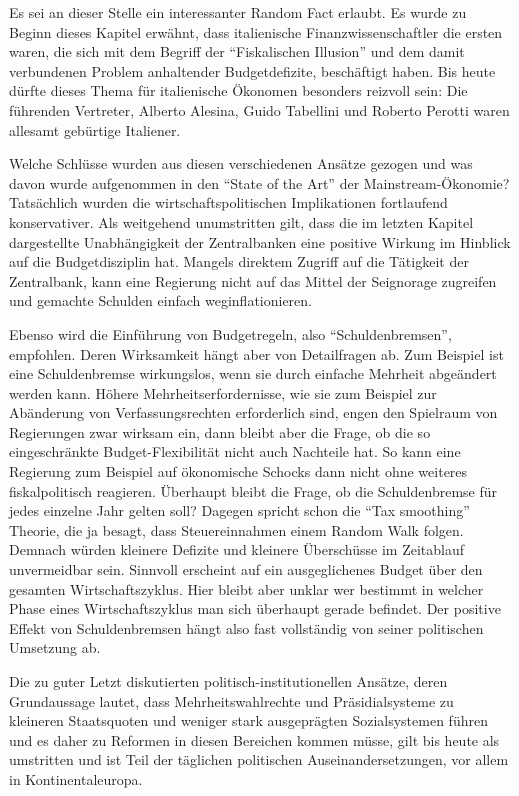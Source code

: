 Es sei an dieser Stelle ein interessanter Random Fact erlaubt. Es wurde zu Beginn dieses Kapitel erwähnt, dass italienische Finanzwissenschaftler die ersten waren, die sich mit dem Begriff der "`Fiskalischen Illusion"' und dem damit verbundenen Problem anhaltender Budgetdefizite, beschäftigt haben. Bis heute dürfte dieses Thema für italienische Ökonomen besonders reizvoll sein: Die führenden Vertreter, Alberto Alesina, Guido Tabellini und Roberto Perotti waren allesamt gebürtige Italiener.

Welche Schlüsse wurden aus diesen verschiedenen Ansätze gezogen und was davon wurde aufgenommen in den "`State of the Art"' der Mainstream-Ökonomie? Tatsächlich wurden die wirtschaftspolitischen Implikationen fortlaufend konservativer. Als weitgehend unumstritten gilt, dass die im letzten Kapitel dargestellte Unabhängigkeit der Zentralbanken eine positive Wirkung im Hinblick auf die Budgetdisziplin hat. Mangels direktem Zugriff auf die Tätigkeit der Zentralbank, kann eine Regierung nicht auf das Mittel der Seignorage zugreifen und gemachte Schulden einfach weginflationieren.

Ebenso wird die Einführung von Budgetregeln, also "`Schuldenbremsen"', empfohlen. Deren Wirksamkeit hängt aber von Detailfragen ab. Zum Beispiel ist eine Schuldenbremse wirkungslos, wenn sie durch einfache Mehrheit abgeändert werden kann. Höhere Mehrheitserfordernisse, wie sie zum Beispiel zur Abänderung von Verfassungsrechten erforderlich sind, engen den Spielraum von Regierungen zwar wirksam ein, dann bleibt aber die Frage, ob die so eingeschränkte Budget-Flexibilität nicht auch Nachteile hat. So kann eine Regierung zum Beispiel auf ökonomische Schocks dann nicht ohne weiteres fiskalpolitisch reagieren. Überhaupt bleibt die Frage, ob die Schuldenbremse für jedes einzelne Jahr gelten soll? Dagegen spricht schon die "`Tax smoothing"' Theorie, die ja besagt, dass Steuereinnahmen einem Random Walk folgen. Demnach würden kleinere Defizite und kleinere Überschüsse im Zeitablauf unvermeidbar sein. Sinnvoll erscheint auf ein ausgeglichenes Budget über den gesamten Wirtschaftszyklus. Hier bleibt aber unklar wer bestimmt in welcher Phase eines Wirtschaftszyklus man sich überhaupt gerade befindet. Der positive Effekt von Schuldenbremsen hängt also fast vollständig von seiner politischen Umsetzung ab.

Die zu guter Letzt diskutierten politisch-institutionellen Ansätze, deren Grundaussage lautet, dass Mehrheitswahlrechte und Präsidialsysteme zu kleineren Staatsquoten und weniger stark ausgeprägten Sozialsystemen führen und es daher zu Reformen in diesen Bereichen kommen müsse, gilt bis heute als umstritten und ist Teil der täglichen politischen Auseinandersetzungen, vor allem in Kontinentaleuropa.

